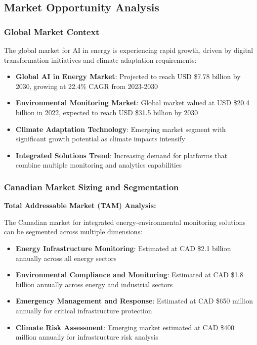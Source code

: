 \subsection{Market Opportunity Analysis}

\subsubsection{Global Market Context}

The global market for AI in energy is experiencing rapid growth, driven by digital transformation initiatives and climate adaptation requirements:

\begin{itemize}
    \item \textbf{Global AI in Energy Market}: Projected to reach USD \$7.78 billion by 2030, growing at 22.4\% CAGR from 2023-2030
    \item \textbf{Environmental Monitoring Market}: Global market valued at USD \$20.4 billion in 2022, expected to reach USD \$31.5 billion by 2030
    \item \textbf{Climate Adaptation Technology}: Emerging market segment with significant growth potential as climate impacts intensify
    \item \textbf{Integrated Solutions Trend}: Increasing demand for platforms that combine multiple monitoring and analytics capabilities
\end{itemize}

\subsubsection{Canadian Market Sizing and Segmentation}

\textbf{Total Addressable Market (TAM) Analysis:}

The Canadian market for integrated energy-environmental monitoring solutions can be segmented across multiple dimensions:

\begin{itemize}
    \item \textbf{Energy Infrastructure Monitoring}: Estimated at CAD \$2.1 billion annually across all energy sectors
    \item \textbf{Environmental Compliance and Monitoring}: Estimated at CAD \$1.8 billion annually across energy and industrial sectors
    \item \textbf{Emergency Management and Response}: Estimated at CAD \$650 million annually for critical infrastructure protection
    \item \textbf{Climate Risk Assessment}: Emerging market estimated at CAD \$400 million annually for infrastructure risk analysis
\end{itemize}

